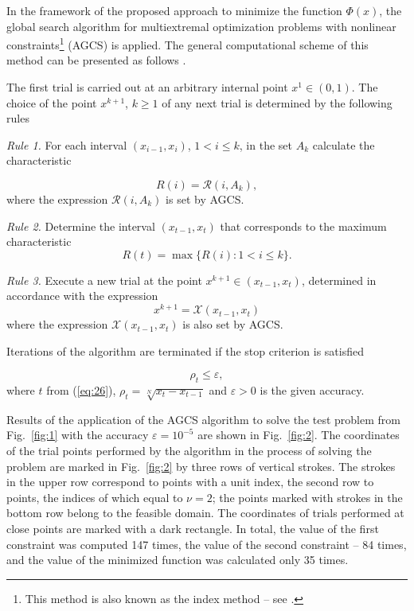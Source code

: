 \documentclass[smallextended]{svjour3}       %
\begin{document}
In the framework of the proposed approach to minimize the function $\Phi(x)$, the global search algorithm for multiextremal optimization problems with nonlinear constraints\footnote{This method is also known as the index method -- see \cite{c18}.} (AGCS) is applied. The general computational scheme of this method can be presented as follows \cite{c18}.

The first trial is carried out at an arbitrary internal point $x^1\in(0,1)$. The choice of the point $x^{k+1}$, $k \geq 1$ of any next trial is determined by the following rules

\textit{Rule 1.} For each interval $(x_{i-1},x_i)$, $1 < i \leq k$, in the set $A_k$ calculate the characteristic

\begin{equation}\label{eq:25}
R(i)=\mathcal{R} (i,A_k),
\end{equation}
where the expression $\mathcal{R}(i,A_k)$ is set by AGCS.

\textit{Rule 2.} Determine the interval $(x_{t-1},x_t)$ that corresponds to the maximum characteristic
\begin{equation}\label{eq:26}
R(t) = \max{\{R(i):1 < i \leq k\}}.
\end{equation}

\textit{Rule 3.} Execute a new trial at the point $x^{k+1} \in (x_{t-1},x_t)$, determined in accordance with the expression
\begin{equation}\label{eq:27}
x^{k+1} = \mathcal{X}(x_{t-1},x_t)
\end{equation}
where the expression $\mathcal{X}(x_{t-1},x_t)$ is also set by AGCS.

Iterations of the algorithm are terminated if the stop criterion is satisfied

\begin{equation}\label{eq:28}
\rho_t\leq \varepsilon,
\end{equation}
where $t$ from (\ref{eq:26}), $\rho_t = \sqrt[N]{x_t-x_{t-1}}$ and $\varepsilon > 0$ is the given accuracy.

Results of the application of the AGCS algorithm to solve the test problem from Fig.~\ref{fig:1} with the accuracy $\varepsilon=10^{-5}$ are shown in Fig.~\ref{fig:2}. The coordinates of the trial points performed by the algorithm in the process of solving the problem are marked in Fig.~\ref{fig:2} by three rows of vertical strokes. The strokes in the upper row correspond to points with a unit index, the second row to points, the indices of which equal to $\nu=2$; the points marked with strokes in the bottom row belong to the feasible domain. The coordinates of trials performed at close points are marked with a dark rectangle. In total, the value of the first constraint was computed 147 times, the value of the second constraint -- 84 times, and the value of the minimized function was calculated only 35 times.
\end{document}
